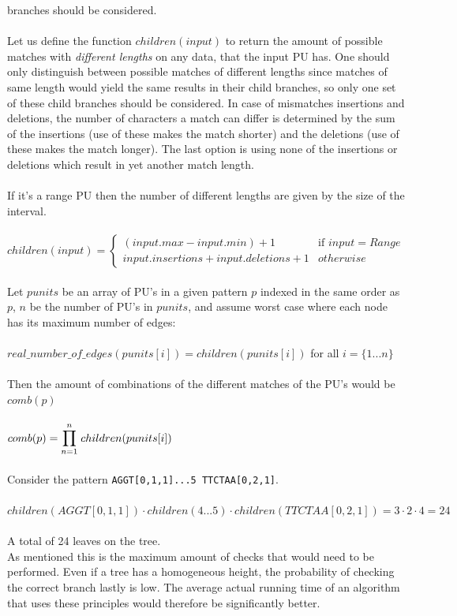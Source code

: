 \documentclass[12pt]{article}
\newcommand{\pu}{PU }
\newcommand{\pus}{PU's }
\begin{document}
branches should be considered. \\ \\
Let us define the function $children(input)$ to return the amount of possible matches with 
\textit{different lengths} on any data, that the input \pu has.
One should only distinguish between possible matches of different lengths since matches of same length would
yield the same results in their child branches, so only one set of these child branches should be considered.
In case of mismatches insertions and deletions, the number of characters a match can differ is determined by 
the sum of the insertions (use of these makes the match shorter)
and the deletions (use of these makes the match longer). The last option is using none of the insertions or deletions which
result in yet another match length. \\ \\
If it's a range \pu then the number of different lengths are given by the size of the interval. \\ \\
$children(input)=
\left\{
\begin{array}{ll}
(input.max - input.min) + 1 & \mbox{if } input=Range \\
input.insertions+input.deletions+1 & otherwise 
\end{array}
\right.$
 \\ \\
Let $punits$ be an array of \pus in a given pattern $p$ indexed in the same order as $p$, $n$ be the number of \pus in $punits$, 
and assume worst case where each node has its maximum number of edges: \\ \\
$real\_number\_of\_edges(punits[i])=children(punits[i])$\;\; for all $i=\{1...n\}$ \\ \\
Then the amount of combinations of the different matches of the \pus would be $comb(p)$ \\ \\
$comb(p)=\mathlarger{\mathlarger{\prod}_{n=1}^{n}\;children(punits[i])}$ \\ \\
Consider the pattern \texttt{AGGT[0,1,1]...5\; TTCTAA[0,2,1]}. \\ \\
$children(AGGT[0,1,1]) \cdot children(4...5) \cdot children(TTCTAA[0,2,1])=3\cdot 2\cdot 4=24$ \\ \\
A total of 24 leaves on the tree. \\
As mentioned this is the maximum amount of checks that would need to be performed. Even if a tree has a homogeneous 
height, the probability of checking the correct branch lastly is low.
The average actual running time of an algorithm that uses these principles would therefore be significantly better.
\end{document}
